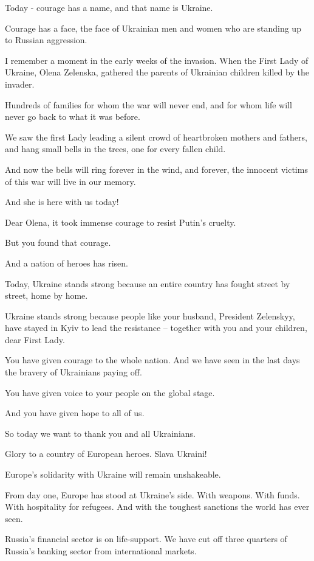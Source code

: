 \documentclass[a4paper,11pt]{article}
\begin{document}
Today - courage has a name, and that name is Ukraine.

Courage has a face, the face of Ukrainian men and women who are standing up to Russian aggression.

I remember a moment in the early weeks of the invasion. When the First Lady of Ukraine, Olena Zelenska, gathered the parents of Ukrainian children killed by the invader.

Hundreds of families for whom the war will never end, and for whom life will never go back to what it was before.

We saw the first Lady leading a silent crowd of heartbroken mothers and fathers, and hang small bells in the trees, one for every fallen child.

And now the bells will ring forever in the wind, and forever, the innocent victims of this war will live in our memory.

And she is here with us today!

Dear Olena, it took immense courage to resist Putin's cruelty.

But you found that courage.

And a nation of heroes has risen.

Today, Ukraine stands strong because an entire country has fought street by street, home by home.

Ukraine stands strong because people like your husband, President Zelenskyy, have stayed in Kyiv to lead the resistance – together with you and your children, dear First Lady.

You have given courage to the whole nation. And we have seen in the last days the bravery of Ukrainians paying off.

You have given voice to your people on the global stage.

And you have given hope to all of us.

So today we want to thank you and all Ukrainians.

Glory to a country of European heroes. Slava Ukraini!

Europe's solidarity with Ukraine will remain unshakeable.

From day one, Europe has stood at Ukraine's side. With weapons. With funds. With hospitality for refugees. And with the toughest sanctions the world has ever seen.

Russia's financial sector is on life-support. We have cut off three quarters of Russia's banking sector from international markets.
\end{document}
